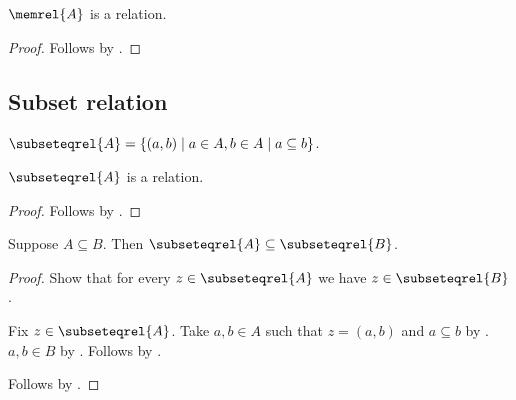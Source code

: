 \begin{proposition}\label{memrel_is_relation}
    $\memrel{A}$ is a relation.
\end{proposition}
\begin{proof}
    Follows by .
\end{proof}

\subsection{Subset relation}

\begin{definition}\label{subseteqrel}
    $\subseteqrel{A} = \{(a, b)\mid a\in A, b\in A \mid a\subseteq b\}$.
\end{definition}

\begin{proposition}\label{subseteqrel_is_relation}
    $\subseteqrel{A}$ is a relation.
\end{proposition}
\begin{proof}
    Follows by .
\end{proof}

\begin{proposition}\label{subseteqrel_monotone}
    Suppose $A\subseteq B$.
    Then $\subseteqrel{A}\subseteq\subseteqrel{B}$.
\end{proposition}
\begin{proof}
    Show that for every $z\in\subseteqrel{A}$ we have
        $z\in\subseteqrel{B}$.
    \begin{subproof}
        Fix $z\in\subseteqrel{A}$.
        Take $a,b\in A$ such that $z=(a,b)$ and $a\subseteq b$ by
            .
        $a,b\in B$ by .
        Follows by .
    \end{subproof}
    Follows by .
\end{proof}
